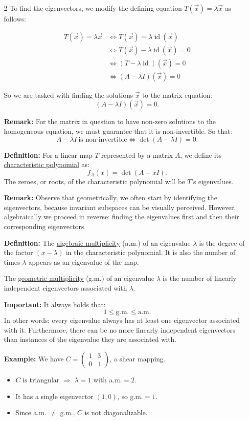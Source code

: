 \documentclass[12pt]{article}
\newcommand{\twobytwo}[4]{\begin{pmatrix} %
    #1 & #2 \\ #3 & #4 \end{pmatrix}}
\newcommand{\To}{\Rightarrow}
\begin{document}
\begin{multicols}{2}
To find the eigenvectors, we modify the defining equation \(T(\vec{x})=\lambda\vec{x}\) as follows:

\begin{align*}
  T(\vec{x})=\lambda\vec{x}&\iff T(\vec{x})=\lambda\operatorname{id}(\vec{x})\\
  &\iff T(\vec{x})-\lambda\operatorname{id}(\vec{x})=0\\
  &\iff \left(T-\lambda\operatorname{id}\right)(\vec{x})=0\\
  &\iff \left(A-\lambda I\right)(\vec{x})=0
\end{align*}

So we are tasked with finding the solutions \(\vec{x}\) to the matrix equation:
\[
 \left(A-\lambda I\right)(\vec{x})=0.
\]

\textbf{Remark:} For the matrix in question to have non-zero solutions to the homogeneous equation, we must guarantee that it is non-invertible. So that: 
\[
A-\lambda I\ \text{is non-invertible}\iff \det(A-\lambda I)=0.
\]

\textbf{Definition:} For a linear map \(T\) represented by a matrix \(A\), we define its \underline{characteristic polynomial} as: 
\[
f_A(x)=\det(A-xI).
\]
The zeroes, or roots, of the characteristic polynomial will be \(T\)'s eigenvalues.

\textbf{Remark:}
Observe that geometrically, we often start by identifying the eigenvectors, because invariant subspaces can be visually perceived. However, algebraically we proceed in reverse: finding the eigenvalues first and then their corresponding eigenvectors.

\textbf{Definition:} 
The \underline{algebraic multiplicity} (a.m.) of an eigenvalue \(\lambda\) is the degree of the factor \((x-\lambda)\) in the characteristic polynomial. It is also the number of times \(\lambda\) appears as an eigenvalue of the map.\par
The \underline{geometric multiplicity} (g.m.) of an eigenvalue \(\lambda\) is the number of linearly independent eigenvectors associated with \(\lambda\).

\textbf{Important:} 
It always holds that: 
\[1\leq \text{g.m.}\leq \text{a.m.}\]
In other words: every eigenvalue always has at least one eigenvector associated with it. Furthermore, there can be no more linearly independent eigenvectors than instances of the eigenvalue they are associated with.

\textbf{Example:} 
We have \(C=\twobytwo{1}{3}{0}{1}\), a shear mapping. 
\begin{itemize}
  \item \(C\) is triangular \(\To\) \(\lambda=1\) with a.m.\(=2\).
  \item It has a single eigenvector \((1,0)\), so g.m.\(=1\).
  \item Since a.m. \(\neq\) g.m., \(C\) is not diagonalizable.
\end{itemize}


\end{multicols}
\end{document}
